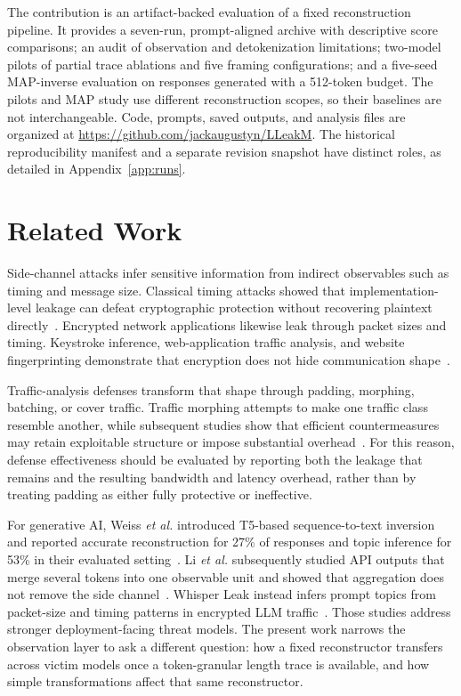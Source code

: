 \documentclass[electronics,article,submit,pdftex,moreauthors]{Definitions/mdpi}
\begin{document}
The contribution is an artifact-backed evaluation of a fixed reconstruction pipeline. It provides a seven-run, prompt-aligned archive with descriptive score comparisons; an audit of observation and detokenization limitations; two-model pilots of partial trace ablations and five framing configurations; and a five-seed MAP-inverse evaluation on responses generated with a 512-token budget. The pilots and MAP study use different reconstruction scopes, so their baselines are not interchangeable. Code, prompts, saved outputs, and analysis files are organized at \url{https://github.com/jackaugustyn/LLeakM}. The historical reproducibility manifest and a separate revision snapshot have distinct roles, as detailed in Appendix~\ref{app:runs}.

\section{Related Work}
Side-channel attacks infer sensitive information from indirect observables such as timing and message size. Classical timing attacks showed that implementation-level leakage can defeat cryptographic protection without recovering plaintext directly~\cite{kocher1996timing}. Encrypted network applications likewise leak through packet sizes and timing. Keystroke inference, web-application traffic analysis, and website fingerprinting demonstrate that encryption does not hide communication shape~\cite{song2001timing,chen2010sidechannel,cai2012touching,sirinam2018deep}.

Traffic-analysis defenses transform that shape through padding, morphing, batching, or cover traffic. Traffic morphing attempts to make one traffic class resemble another, while subsequent studies show that efficient countermeasures may retain exploitable structure or impose substantial overhead~\cite{wright2009morphing,dyer2012peekaboo}. For this reason, defense effectiveness should be evaluated by reporting both the leakage that remains and the resulting bandwidth and latency overhead, rather than by treating padding as either fully protective or ineffective.

For generative AI, Weiss \emph{et al.} introduced T5-based sequence-to-text inversion and reported accurate reconstruction for 27\% of responses and topic inference for 53\% in their evaluated setting~\cite{weiss2024prompt}. Li \emph{et al.} subsequently studied API outputs that merge several tokens into one observable unit and showed that aggregation does not remove the side channel~\cite{li2026length}. Whisper Leak instead infers prompt topics from packet-size and timing patterns in encrypted LLM traffic~\cite{whisperleak2025}. Those studies address stronger deployment-facing threat models. The present work narrows the observation layer to ask a different question: how a fixed reconstructor transfers across victim models once a token-granular length trace is available, and how simple transformations affect that same reconstructor.
\end{document}
